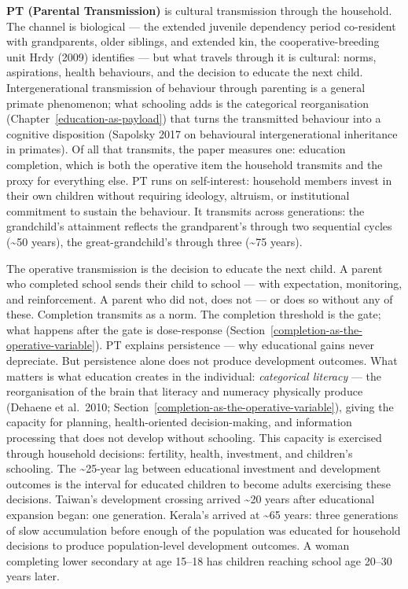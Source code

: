 \documentclass[12pt,letterpaper]{article}
\begin{document}
\textbf{PT (Parental Transmission)} is cultural transmission through
the household. The channel is biological --- the extended juvenile
dependency period co-resident with grandparents, older siblings, and
extended kin, the cooperative-breeding unit Hrdy (2009) identifies ---
but what travels through it is cultural: norms, aspirations, health
behaviours, and the decision to educate the next child.
Intergenerational transmission of behaviour through parenting is a
general primate phenomenon; what schooling adds is the categorical
reorganisation (Chapter~\ref{education-as-payload}) that turns the
transmitted behaviour into a cognitive disposition (Sapolsky 2017 on
behavioural intergenerational inheritance in primates). Of all that
transmits, the paper measures one: education completion, which is
both the operative item the household transmits and the proxy for
everything else.
PT runs on self-interest: household members invest in their own
children without requiring ideology, altruism, or institutional
commitment to sustain the behaviour. It transmits across generations:
the grandchild's attainment reflects the grandparent's through two
sequential cycles (\textasciitilde50 years), the great-grandchild's
through three (\textasciitilde75 years).

The operative transmission is the decision to educate the next child. A parent who completed school sends their child
to school --- with expectation, monitoring, and reinforcement. A parent
who did not, does not --- or does so without any of these. Completion
transmits as a norm. The completion threshold is the gate; what happens
after the gate is dose-response
(Section~\ref{completion-as-the-operative-variable}).
PT explains persistence --- why educational gains never depreciate. But
persistence alone does not produce development outcomes. What matters is
what education creates in the individual: \emph{categorical literacy}
--- the reorganisation of the brain that literacy and numeracy physically
produce (Dehaene et al.~2010; Section~\ref{completion-as-the-operative-variable}),
giving the capacity for planning, health-oriented decision-making, and
information processing that does not develop without schooling.
This capacity is exercised
through household decisions: fertility, health, investment, and
children's schooling. The \textasciitilde25-year
lag between educational investment and development outcomes is the
interval for educated children to become adults exercising these
decisions. Taiwan's development crossing arrived \textasciitilde20 years
after educational expansion began: one generation. Kerala's
arrived at \textasciitilde65 years: three generations of slow
accumulation before enough of the population was educated for household
decisions to produce population-level development outcomes. A woman
completing lower secondary at age 15--18 has children reaching school
age 20--30 years later.
\end{document}
